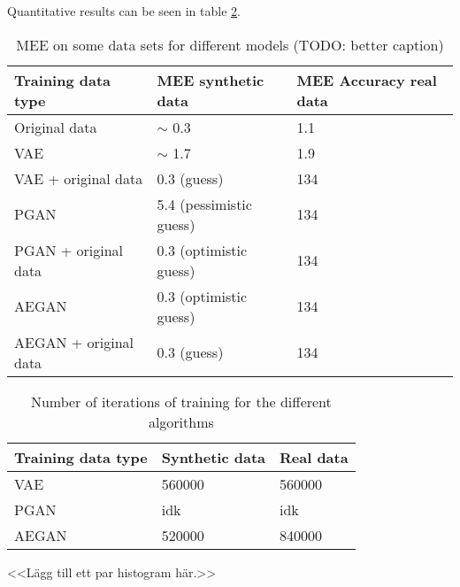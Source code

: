 Quantitative results can be seen in table \ref{tab:quantitative_results}.

\begin{table}[t]
    \centering
    \caption{MEE on some data sets for different models (TODO: better caption) }
    \label{tab:quantitative_results}
    \begin{tabular}{l|l|l}
    \hline
    Training data type      & MEE synthetic data  & MEE Accuracy real data \\ \hline
    Original data           & $\sim$ 0.3 & 1.1     \\
    VAE                     & $\sim$ 1.7 & 1.9     \\
    VAE + original data     & 0.3 (guess) & 134     \\
    PGAN                    & 5.4 (pessimistic guess) & 134     \\
    PGAN + original data    & 0.3 (optimistic guess) & 134     \\
    AEGAN                   & 0.3 (optimistic guess) & 134     \\
    AEGAN + original data   & 0.3 (guess) & 134     \\
    \end{tabular}
\end{table}

\begin{table}[t]
    \centering
    \caption{Number of iterations of training for the different algorithms}
    \label{tab:quantitative_results}
    \begin{tabular}{l|l|l}
    \hline
    Training data type      & Synthetic data  & Real data \\ \hline
    VAE                     & 560000 & 560000 \\
    PGAN                    & idk & idk     \\
    AEGAN                   & 520000 & 840000   \\
    \end{tabular}
\end{table}

<<Lägg till ett par histogram här.>>
